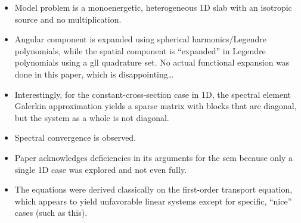 \begin{itemize}
  \item Model problem is a monoenergetic, heterogeneous 1D slab with an isotropic source and no multiplication.
  \item Angular component is expanded using spherical harmonics/Legendre polynomials, while the spatial component is ``expanded'' in Legendre polynomials using a \gls{gll} quadrature set. No actual functional expansion was done in this paper, which is disappointing\dots
  \item Interestingly, for the constant-cross-section case in 1D, the spectral element Galerkin approximation yields a sparse matrix with blocks that are diagonal, but the system as a whole is not diagonal.
  \item Spectral convergence is observed.
  \item Paper acknowledges deficiencies in its arguments for the \gls{sem} because only a single 1D case was explored and not even fully.
  \item The \Pn equations were derived classically on the first-order transport equation, which appears to yield unfavorable linear systems except for specific, ``nice'' cases (such as this).
\end{itemize}
